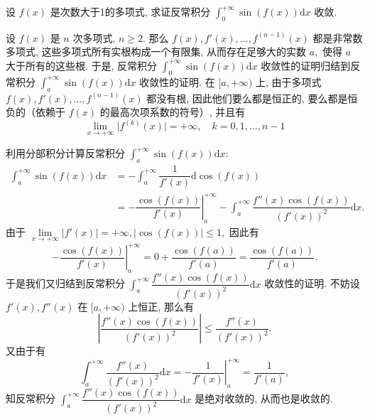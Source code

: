 \begin{question}[points = 10]
设 $f(x)$ 是次数大于1的多项式, 求证反常积分 $\int_{0}^{+\infty} \sin(f(x)) \mathrm{d}x$ 收敛.

\end{question}

\begin{solution}
设 $f(x)$ 是 $n$ 次多项式, $n \geqslant 2.$ 那么 $f(x), f'(x), \dots, f^{(n-1)}(x)$ 都是非常数多项式, 这些多项式所有实根构成一个有限集, 从而存在足够大的实数 $a,$ 使得 $a$ 大于所有的这些根. 于是, 反常积分 $\int_{0}^{+\infty} \sin(f(x)) \mathrm{d}x$ 收敛性的证明归结到反常积分 $\int_{a}^{+\infty} \sin(f(x)) \mathrm{d}x$ 收敛性的证明. 在 $[a, +\infty)$ 上, 由于多项式 $f(x), f'(x), \dots, f^{(n-1)}(x)$ 都没有根, 因此他们要么都是恒正的, 要么都是恒负的（依赖于 $f(x)$ 的最高次项系数的符号）, 并且有
$$\lim\limits_{x \to +\infty} \lvert f^{(k)}(x) \rvert = +\infty, \quad k = 0, 1, \dots, n-1$$

利用分部积分计算反常积分 $\int_{a}^{+\infty} \sin(f(x)) \mathrm{d}x:$
\begin{align*}
\int_{a}^{+\infty} \sin(f(x)) \mathrm{d}x & = -\int_{a}^{+\infty} \dfrac{1}{f'(x)} \mathrm{d} \cos(f(x)) \\
& = - \left. \dfrac{\cos(f(x))}{f'(x)} \right|_{a}^{+\infty} - \int_{a}^{+\infty} \dfrac{f''(x) \cos(f(x))}{\left(f'(x)\right)^2} \mathrm{d}x.
\end{align*}
由于 $\lim\limits_{x \to +\infty} \lvert f'(x) \rvert = +\infty, \lvert \cos(f(x)) \rvert \leqslant 1,$ 因此有
$$- \left. \dfrac{\cos(f(x))}{f'(x)} \right|_{a}^{+\infty} = 0 + \dfrac{\cos(f(a))}{f'(a)} = \dfrac{\cos(f(a))}{f'(a)}.$$
于是我们又归结到反常积分 $\int_{a}^{+\infty} \dfrac{f''(x) \cos(f(x))}{\left(f'(x)\right)^2} \mathrm{d}x$ 收敛性的证明. 不妨设 $f'(x), f''(x)$ 在 $[a, +\infty)$ 上恒正, 那么有
$$\left\lvert \dfrac{f''(x) \cos(f(x))}{\left(f'(x)\right)^2} \right\rvert \leqslant \dfrac{f''(x)}{\left(f'(x)\right)^2}.$$
又由于有
$$\int_{a}^{+\infty} \dfrac{f''(x)}{\left(f'(x)\right)^2} \mathrm{d}x = - \left. \dfrac{1}{f'(x)} \right|_{a}^{+\infty} = \dfrac{1}{f'(a)}, $$
知反常积分 $\int_{a}^{+\infty} \dfrac{f''(x) \cos(f(x))}{\left(f'(x)\right)^2} \mathrm{d}x$ 是绝对收敛的, 从而也是收敛的.
\end{solution}

